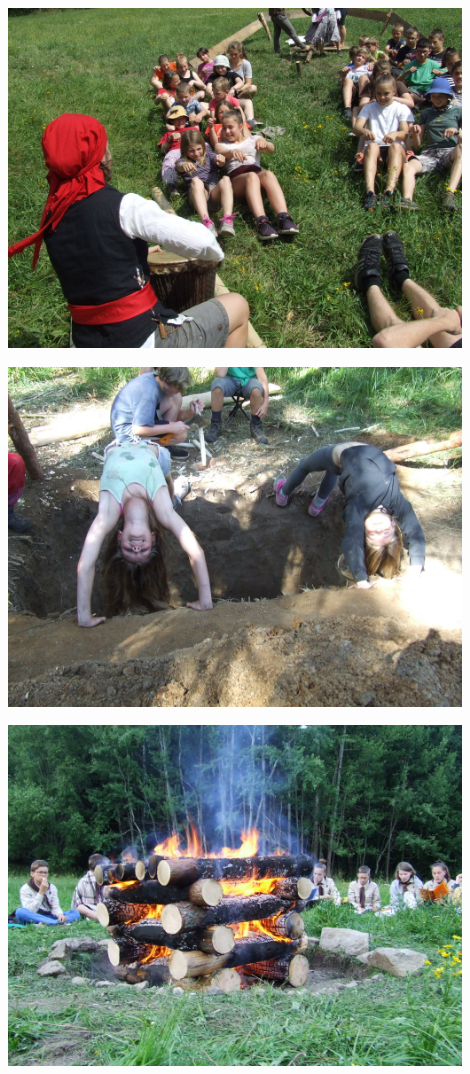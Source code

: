 \begin{center}
\includegraphics[width=12cm]{img/hanyetu_tabor/veslovani.JPG}

\clearpage
\includegraphics[width=12cm]{img/hanyetu_tabor/mosty.JPG}
\vspace*{10pt}

\includegraphics[width=12cm]{img/hanyetu_tabor/ohen.JPG}



\end{center}

\clearpage

